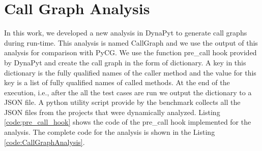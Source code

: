 \section{Call Graph Analysis}
\label{impl:Call Graph Analysis}
In this work, we developed a new analysis in DynaPyt to generate call graphs during run-time.
This analysis is named CallGraph and we use the output of this analysis for comparison with PyCG.
We use the function pre\_call hook provided by DynaPyt and create the call graph in the form of dictionary.
A key in this dictionary is the fully qualified names of the caller method and the value for this key is a list of fully qualified names of called methods.
At the end of the execution, i.e., after the all the test cases are run we output the dictionary to a JSON file.
A python utility script provide by the benchmark collects all the JSON files from the projects that were dynamically analyzed.
Listing \ref{code:pre_call_hook} shows the code of the pre\_call hook implemented for the analysis.
The complete code for the analysis is shown in the Listing \ref{code:CallGraphAnalysis}.
